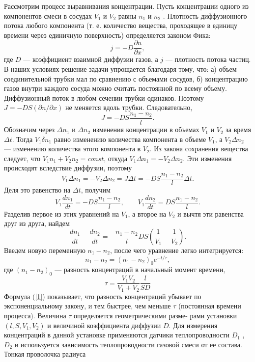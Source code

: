 \documentclass[a4paper, 12pt]{article}%
\begin{document}
Рассмотрим процесс выравнивания концентрации. Пусть концентрации одного из компонентов смеси в сосудах $V_1$ и $V_2$ равны $n_1$ и
$n_2$ . Плотность диффузионного потока любого компонента (т. е. количество вещества, проходящее в единицу времени через единичную
поверхность) определяется законом Фика:
\[
j = - D \frac{\partial n}{\partial x},
\]
где $D$ --- коэффициент взаимной диффузии газов, а $j$ --- плотность
потока частиц. В наших условиях решение задачи упрощается благодаря тому, что: а) объем соединительной трубки мал по сравнению
с объемами сосудов, б) концентрацию газов внутри каждого сосуда
можно считать постоянной по всему объему. Диффузионный поток в
любом сечении трубки одинаков. Поэтому $J = - D S (\partial n / \partial x )$ не меняется вдоль трубки. Следовательно,
\[
	J = - D S \frac{n_1 - n_2}{l}.
\]
Обозначим через $\Delta n_1$ и $\Delta n_2$  изменения концентрации в объемах $V_1$ и $V_2$ за время $\Delta t$. Тогда $V_1 \delta n_1$ равно изменению количества компонента в объеме $V_1$, а $V_2 \Delta n_2$ --- изменению количества этого компонента в $V_2$. Из закона сохранения вещества следует, что $V_1 n_1 + V_2 n_2 = const$, откуда $V_1 \Delta n_1 = - V_2 \Delta n_2$. Эти изменения происходят вследствие диффузии, поэтому
\[
	V_1 \Delta n_1 = -V_2 \Delta n_2 = J \Delta t = -DS \frac{n_1 - n_2}{l} \Delta t.
\]
Деля это равенство на $\Delta t$, получим
\[
	V_1 \frac{dn_1}{dt} = -DS\frac{n_1 - n_2}{l}, \qquad V_1 \frac{dn_2}{dt} = DS\frac{n_1 - n_2}{l}.
\]
Разделив первое из этих уравнений на $V_1$, а второе на $V_2$ и вычтя эти равенства друг из друга, найдем
\[
	\frac{dn_1}{dt} - \frac{dn_2}{dt} = -\frac{n_1 - n_2}{l}DS \left( \frac{1}{V_1} - \frac{1}{V_2} \right).
\]
Введем новую переменную $n_1 - n_2$, после чего уравнение легко интегрируется:
\begin{equation}
\label{1}
	n_1 - n_2 = {(n_1 - n_2)}_0e^{-t/\tau},
\end{equation}
где ${(n_1 - n_2)}_0$ --- разность концентраций в начальный момент времени,
\begin{equation}
	\tau = \frac{V_1 V_2}{V_1 + V_2}\frac{l}{SD}
\end{equation}
Формула (\ref{1}) показывает, что разность концентраций убывает по экспоненциальному закону, и тем быстрее, чем меньше $\tau$ (постоянная
времени процесса). Величина $\tau$ определяется геометрическими разме-
рами установки $(l, S, V_1, V_2)$ и величиной коэффициента диффузии
$D$. Для измерения концентраций в данной установке применяются
датчики теплопроводности $D_1$ , $D_2$ и используется зависимость 
теплопроводности газовой смеси от ее состава. Тонкая проволочка радиуса 
\end{document}
